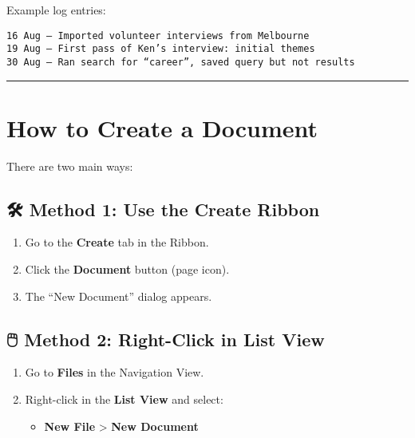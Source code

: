 \documentclass[
  letterpaper,
  DIV=11,
  numbers=noendperiod]{scrreprt}
\providecommand{\tightlist}{%
  \setlength{\itemsep}{0pt}\setlength{\parskip}{0pt}}\usepackage{longtable,booktabs,array}
\begin{document}
Example log entries:

\begin{verbatim}
16 Aug – Imported volunteer interviews from Melbourne  
19 Aug – First pass of Ken’s interview: initial themes  
30 Aug – Ran search for “career”, saved query but not results  
\end{verbatim}

\begin{center}\rule{0.5\linewidth}{0.5pt}\end{center}

\section{How to Create a Document}\label{how-to-create-a-document}

There are two main ways:

\subsection{🛠️ Method 1: Use the Create
Ribbon}\label{method-1-use-the-create-ribbon}

\begin{enumerate}
\def\labelenumi{\arabic{enumi}.}
\tightlist
\item
  Go to the \textbf{Create} tab in the Ribbon.
\item
  Click the \textbf{Document} button (page icon).
\item
  The ``New Document'' dialog appears.
\end{enumerate}

\subsection{🖱️ Method 2: Right-Click in List
View}\label{method-2-right-click-in-list-view}

\begin{enumerate}
\def\labelenumi{\arabic{enumi}.}
\tightlist
\item
  Go to \textbf{Files} in the Navigation View.
\item
  Right-click in the \textbf{List View} and select:

  \begin{itemize}
  \tightlist
  \item
    \textbf{New File} \textgreater{} \textbf{New Document}
  \end{itemize}
\end{enumerate}
\end{document}
